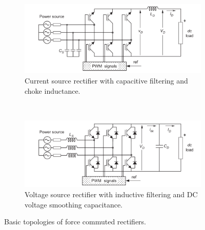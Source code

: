 \begin{figure}[h]
                \centering
                \begin{subfigure}[b]{0.9\textwidth}
                    \includegraphics[width=\textwidth]{EMPC_PNG_Pics/BasicCurrentRectifiers.png}
                    \caption{\centering Current source rectifier with capacitive filtering and choke inductance.}
                    \label{BASICMPC:fig:CSR}
                \end{subfigure}
                ~ %
                \begin{subfigure}[b]{0.9\textwidth}
                    \includegraphics[width=\textwidth]{EMPC_PNG_Pics/BasicVoltageRectifiers.png}
                    \caption{\centering Voltage source rectifier with inductive filtering and DC voltage smoothing capacitance.}
                    \label{BASICMPC:fig:VSR}
                \end{subfigure}


                \caption{Basic topologies of force commuted rectifiers.}
            \end{figure}

